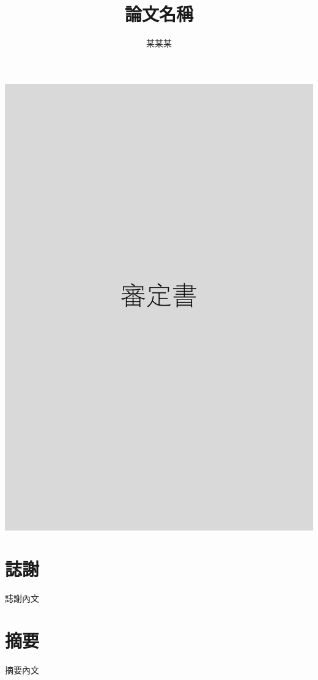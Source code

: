 \documentclass{ccuthesis}
\title{論文名稱}{Thesis Title}
\author{某某某}
\begin{document}
\makecover

\clearpage
\begin{center}
\includegraphics[width=\textwidth]{certification example.pdf}  %
\end{center}

\clearpage
{}
\section*{誌謝}
誌謝內文



\clearpage
{}
\section*{摘要}
摘要內文
\end{document}
